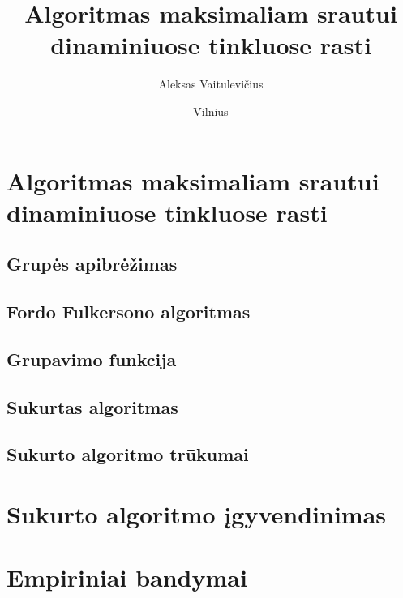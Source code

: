 \documentclass{VUMIFInfBakalaurinis}
\title{Algoritmas maksimaliam srautui dinaminiuose tinkluose rasti}
\author{Aleksas Vaitulevičius}
\date{Vilnius \\ \the\year}
\begin{document}
\maketitle

\tableofcontents





\section{Algoritmas maksimaliam srautui dinaminiuose tinkluose rasti}
\subsection{Grupės apibrėžimas}


\subsection{Fordo Fulkersono algoritmas}


\subsection{Grupavimo funkcija}


\subsection{Sukurtas algoritmas}


\subsection{Sukurto algoritmo trūkumai}


\section{Sukurto algoritmo įgyvendinimas}


\section{Empiriniai bandymai}





\end{document}
